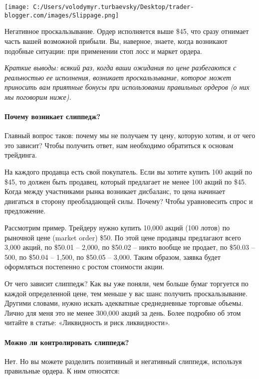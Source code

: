 \documentclass[a5paper]{article}
\begin{document}
\texttt{[image: C:/Users/volodymyr.turbaevsky/Desktop/trader-blogger.com/images/Slippage.png]}

    Негативное проскальзывание. Ордер исполняется выше \$45, что сразу отнимает часть вашей возможной прибыли. Вы, наверное, знаете, когда возникают подобные ситуации: при применении стоп лосс и маркет ордера.

    \emph{Краткие выводы: всякий раз, когда ваши ожидания по цене
      разбегаются с реальностью ее исполнения, возникает
      проскальзывание, которое может приносить вам приятные бонусы при
      использовании правильных ордеров (о них мы поговорим ниже).}

\paragraph{Почему возникает слиппедж?}

Главный вопрос таков: почему мы не получаем ту цену, которую хотим, и от чего это зависит? Чтобы получить ответ, нам необходимо обратиться к основам трейдинга.

На каждого продавца есть свой покупатель. Если вы хотите купить 100 акций по \$45, то должен быть продавец, который предлагает не менее 100 акций по \$45. Когда между участниками рынка возникает дисбаланс, то цена начинает двигаться в сторону преобладающей силы. Почему? Чтобы уравновесить спрос и предложение.

Рассмотрим пример. Трейдеру нужно купить 10,000 акций (100 лотов) по рыночной цене (market order) \$50. По этой цене продавцы предлагают всего 3,000 акций, по \$50.01 – 2,000, по \$50.02 – никто вообще не продает, по \$50.03 – 500, по \$50.04 – 1,500, по \$50.05 – 3,000. Таким образом, заявка будет оформляться постепенно с ростом стоимости акции.

От чего зависит слиппедж? Как вы уже поняли, чем больше бумаг
торгуется по каждой определенной цене, тем меньше у вас шанс получить
проскальзывание. Другими словами, нужно искать адекватные
среднедневные торговые объемы. Лично для меня это не менее 300,000
акций за день. Более подробно об этом читайте в статье: «Ликвидность и
риск ликвидности».

\paragraph{Можно ли контролировать слиппедж?}

Нет. Но вы можете разделить позитивный и негативный слиппедж, используя правильные ордера. К ним относятся:
\end{document}
